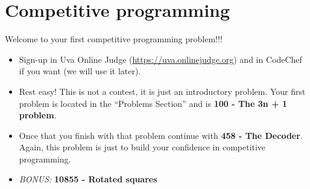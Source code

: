 \section{Competitive programming}

Welcome to your first competitive programming problem!!! 

\begin{itemize}
    \item Sign-up in Uva Online Judge (\url{https://uva.onlinejudge.org}) and in CodeChef if you want (we will use it later).
    \item Rest easy! This is not a contest, it is just an introductory problem. Your first problem is located in the ``Problems Section'' and is \textbf{100 - The 3n + 1 problem}.
    
    \item Once that you finish with that problem continue with \textbf{458 - The Decoder}. Again, this problem is just to build your confidence in competitive programming.
    
    \item \emph{BONUS:} \textbf{10855 - Rotated squares}
\end{itemize}



